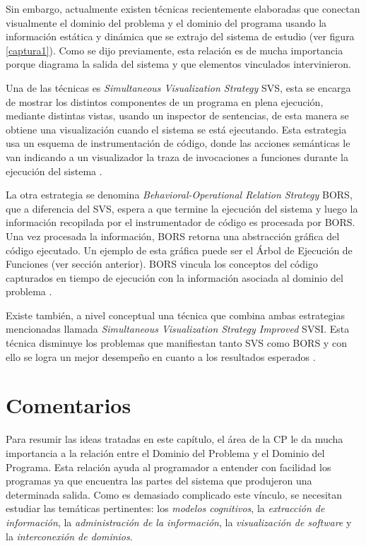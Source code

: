 \documentclass[a4paper,12pt]{report}
\begin{document}
Sin embargo, actualmente existen técnicas recientemente elaboradas que conectan visualmente el dominio del problema y el dominio del programa usando la información estática y dinámica que se extrajo del sistema de estudio (ver figura \ref{captura1}). Como se dijo previamente, esta relación es de mucha importancia porque diagrama la salida del sistema y que elementos vinculados intervinieron.

Una de las técnicas es \textit{Simultaneous Visualization Strategy} SVS, esta se encarga de mostrar los distintos componentes de un programa en plena ejecución, mediante distintas vistas, usando un inspector de sentencias, de esta manera se obtiene una visualización cuando el sistema se está ejecutando. Esta estrategia usa un esquema de instrumentación de código, donde las acciones semánticas le van indicando a un visualizador la traza de invocaciones a funciones durante la ejecución del sistema \cite{BRM10,MPMR07,MBPHRU10}.

La otra estrategia se denomina \textit{Behavioral-Operational Relation Strategy} BORS, que a diferencia del SVS, espera a que termine la ejecución del sistema y luego la información recopilada por el instrumentador de código es procesada por BORS. Una vez procesada la información, BORS retorna una abstracción gráfica del código ejecutado. Un ejemplo de esta gráfica puede ser el Árbol de Ejecución de Funciones (ver sección anterior). BORS vincula los conceptos del código capturados en tiempo de ejecución con la información asociada al dominio del problema \cite{BRM10,MPMR07,MBPHRU10}.

Existe también, a nivel conceptual una técnica que combina ambas estrategias mencionadas llamada \textit{Simultaneous Visualization Strategy Improved} SVSI. Esta técnica disminuye los problemas que manifiestan tanto SVS como BORS y con ello se logra un mejor desempeño en cuanto a los resultados esperados \cite{BRM10,MPMR07,MBPHRU10}.

\section{Comentarios}

Para resumir las ideas tratadas en este capítulo, el área de la CP le da mucha importancia a la relación entre el Dominio del Problema y el Dominio del Programa. Esta relación ayuda al programador a entender con facilidad los programas ya que encuentra las partes del sistema que produjeron una determinada salida. Como es demasiado complicado este vínculo, se necesitan estudiar las temáticas pertinentes: los \textit{modelos cognitivos}, la \textit{extracción de información}, la \textit{administración de la información}, la \textit{visualización de software} y la \textit{interconexión de dominios}.
\end{document}
